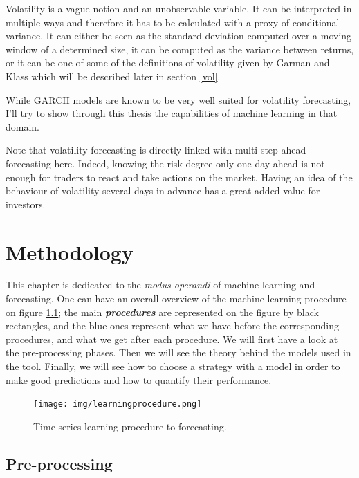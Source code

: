 \documentclass[11pt,a4paper,oneside]{book}
\begin{document}
Volatility is a vague notion and an unobservable variable. It can be interpreted in multiple ways and therefore it has to be calculated with a proxy of conditional variance. It can either be seen as the standard deviation computed over a moving window of a determined size, it can be computed as the variance between returns, or it can be one of some of the definitions of volatility given by Garman and Klass \cite{garm} which will be described later in section \ref{vol}.

While GARCH models are known to be very well suited for volatility forecasting, I'll try to show through this thesis the capabilities of machine learning in that domain.

Note that volatility forecasting is directly linked with multi-step-ahead forecasting here. Indeed, knowing the risk degree only one day ahead is not enough for traders to react and take actions on the market. Having an idea of the behaviour of volatility several days in advance has a great added value for investors.




\chapter{Methodology}\label{methodo}

This chapter is dedicated to the \textit{modus operandi} of machine learning and forecasting. One can have an overall overview of the machine learning procedure on figure \ref{fig:ML}; the main \textit{\textbf{procedures}} are represented on the figure by black rectangles, and the blue ones represent what we have before the corresponding procedures, and what we get after each procedure. We will first have a look at the pre-processing phases. Then we will see the theory behind the models used in the tool. Finally, we will see how to choose a strategy with a model in order to make good predictions and how to quantify their performance.

\begin{figure}[ht]
  \centering
    \texttt{[image: img/learningprocedure.png]}
  \caption{Time series learning procedure to forecasting.}
  \label{fig:ML}
\end{figure}



\section{Pre-processing}
\end{document}
